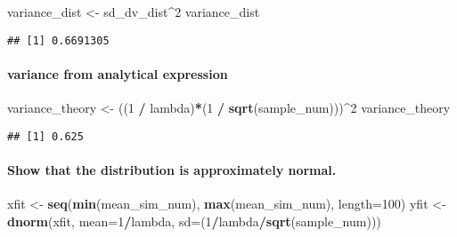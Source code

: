 \documentclass[
]{article}
\newenvironment{Shaded}{\begin{snugshade}}{\end{snugshade}}
\newcommand{\DataTypeTok}[1]{\textcolor[rgb]{0.13,0.29,0.53}{#1}}
\newcommand{\DecValTok}[1]{\textcolor[rgb]{0.00,0.00,0.81}{#1}}
\newcommand{\KeywordTok}[1]{\textcolor[rgb]{0.13,0.29,0.53}{\textbf{#1}}}
\newcommand{\NormalTok}[1]{#1}
\newcommand{\OperatorTok}[1]{\textcolor[rgb]{0.81,0.36,0.00}{\textbf{#1}}}
\newcommand{\StringTok}[1]{\textcolor[rgb]{0.31,0.60,0.02}{#1}}
\begin{document}
\begin{Shaded}
\begin{Highlighting}[]
\NormalTok{variance\_dist \textless{}{-}}\StringTok{ }\NormalTok{sd\_dv\_dist}\OperatorTok{\^{}}\DecValTok{2}
\NormalTok{variance\_dist}
\end{Highlighting}
\end{Shaded}

\begin{verbatim}
## [1] 0.6691305
\end{verbatim}

\hypertarget{variance-from-analytical-expression}{%
\paragraph{variance from analytical
expression}\label{variance-from-analytical-expression}}

\begin{Shaded}
\begin{Highlighting}[]
\NormalTok{variance\_theory \textless{}{-}}\StringTok{ }\NormalTok{((}\DecValTok{1} \OperatorTok{/}\StringTok{ }\NormalTok{lambda)}\OperatorTok{*}\NormalTok{(}\DecValTok{1} \OperatorTok{/}\StringTok{ }\KeywordTok{sqrt}\NormalTok{(sample\_num)))}\OperatorTok{\^{}}\DecValTok{2}
\NormalTok{variance\_theory}
\end{Highlighting}
\end{Shaded}

\begin{verbatim}
## [1] 0.625
\end{verbatim}

\hypertarget{show-that-the-distribution-is-approximately-normal.}{%
\paragraph{Show that the distribution is approximately
normal.}\label{show-that-the-distribution-is-approximately-normal.}}

\begin{Shaded}
\begin{Highlighting}[]
\NormalTok{xfit \textless{}{-}}\StringTok{ }\KeywordTok{seq}\NormalTok{(}\KeywordTok{min}\NormalTok{(mean\_sim\_num), }\KeywordTok{max}\NormalTok{(mean\_sim\_num), }\DataTypeTok{length=}\DecValTok{100}\NormalTok{)}
\NormalTok{yfit \textless{}{-}}\StringTok{ }\KeywordTok{dnorm}\NormalTok{(xfit, }\DataTypeTok{mean=}\DecValTok{1}\OperatorTok{/}\NormalTok{lambda, }\DataTypeTok{sd=}\NormalTok{(}\DecValTok{1}\OperatorTok{/}\NormalTok{lambda}\OperatorTok{/}\KeywordTok{sqrt}\NormalTok{(sample\_num)))}
\end{Highlighting}
\end{Shaded}
\end{document}
